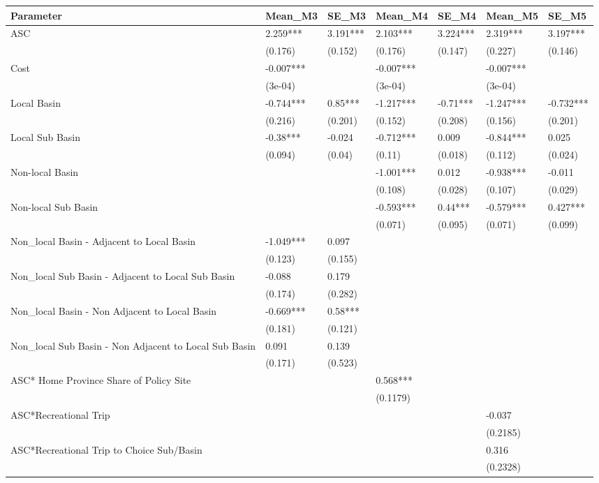 \begin{table}[ht]
\centering
\begin{tabular}{lllllll}
  \hline
Parameter & Mean\_M3 & SE\_M3 & Mean\_M4 & SE\_M4 & Mean\_M5 & SE\_M5 \\ 
  \hline
ASC & 2.259*** & 3.191*** & 2.103*** & 3.224*** & 2.319*** & 3.197*** \\ 
   & (0.176) & (0.152) & (0.176) & (0.147) & (0.227) & (0.146) \\ 
  Cost & -0.007*** &  & -0.007*** &  & -0.007*** &  \\ 
   & (3e-04) &  & (3e-04) &  & (3e-04) &  \\ 
  Local Basin & -0.744*** & 0.85*** & -1.217*** & -0.71*** & -1.247*** & -0.732*** \\ 
   & (0.216) & (0.201) & (0.152) & (0.208) & (0.156) & (0.201) \\ 
  Local Sub Basin & -0.38*** & -0.024 & -0.712*** & 0.009 & -0.844*** & 0.025 \\ 
   & (0.094) & (0.04) & (0.11) & (0.018) & (0.112) & (0.024) \\ 
  Non-local Basin &  &  & -1.001*** & 0.012 & -0.938*** & -0.011 \\ 
   &  &  & (0.108) & (0.028) & (0.107) & (0.029) \\ 
  Non-local Sub Basin &  &  & -0.593*** & 0.44*** & -0.579*** & 0.427*** \\ 
   &  &  & (0.071) & (0.095) & (0.071) & (0.099) \\ 
  Non\_local Basin - Adjacent to Local Basin & -1.049*** & 0.097 &  &  &  &  \\ 
   & (0.123) & (0.155) &  &  &  &  \\ 
  Non\_local Sub Basin - Adjacent to Local Sub Basin & -0.088 & 0.179 &  &  &  &  \\ 
   & (0.174) & (0.282) &  &  &  &  \\ 
  Non\_local Basin - Non Adjacent to Local Basin & -0.669*** & 0.58*** &  &  &  &  \\ 
   & (0.181) & (0.121) &  &  &  &  \\ 
  Non\_local Sub Basin - Non Adjacent to Local Sub Basin & 0.091 & 0.139 &  &  &  &  \\ 
   & (0.171) & (0.523) &  &  &  &  \\ 
  ASC* Home Province Share of Policy Site &  &  & 0.568*** &  &  &  \\ 
   &  &  & (0.1179) &  &  &  \\ 
  ASC*Recreational Trip &  &  &  &  & -0.037 &  \\ 
   &  &  &  &  & (0.2185) &  \\ 
  ASC*Recreational Trip to Choice Sub/Basin &  &  &  &  & 0.316 &  \\ 
   &  &  &  &  & (0.2328) &  \\ 
   \hline
\end{tabular}
\end{table}
